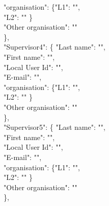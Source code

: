 {\begin{flushleft}
    "organisation": \{"L1": "\@supervisorCsSchool",\\
    \ifx\@supervisorCsDepartment\@empty\relax
    \else
    "L2": "\@supervisorCsDepartment"
    \fi
    \}\\
    \fi
    \else
    "Other organisation": "\@supervisorCsOrganization"\\
    \fi
    \},\\
    \fi
    \ifx\@supervisorDsLastname\@empty\relax
    \else
    "Supervisor4": \{ "Last name": "\@supervisorDsLastname",\\
    \ifx\@supervisorDsFirstname\@empty\relax
    \else
    "First name": "\@supervisorDsFirstname",\\
    \fi
    \ifx\@supervisorDsKTHID\@empty\relax
    \else
    "Local User Id": "\@supervisorDsKTHID",\\
    \fi
    \ifx\@supervisorDsEmail\@empty\relax
    \else
    "E-mail": "\@supervisorDsEmail",\\
    \fi
    \ifx\@supervisorDsOrganization\@empty
    \ifx\@supervisorDsSchool\@empty\relax
    \else
    "organisation": \{"L1": "\@supervisorDsSchool",\\
    \ifx\@supervisorDsDepartment\@empty\relax
    \else
    "L2": "\@supervisorDsDepartment"
    \fi
    \}\\
    \fi
    \else
    "Other organisation": "\@supervisorDsOrganization"\\
    \fi
    \},\\
    \fi
    \ifx\@supervisorEsLastname\@empty\relax
    \else
    "Supervisor5": \{ "Last name": "\@supervisorEsLastname",\\
    \ifx\@supervisorEsFirstname\@empty\relax
    \else
    "First name": "\@supervisorEsFirstname",\\
    \fi
    \ifx\@supervisorEsKTHID\@empty\relax
    \else
    "Local User Id": "\@supervisorEsKTHID",\\
    \fi
    \ifx\@supervisorEsEmail\@empty\relax
    \else
    "E-mail": "\@supervisorEsEmail",\\
    \fi
    \ifx\@supervisorEsOrganization\@empty
    \ifx\@supervisorEsSchool\@empty\relax
    \else
    "organisation": \{"L1": "\@supervisorEsSchool",\\
    \ifx\@supervisorEsDepartment\@empty\relax
    \else
    "L2": "\@supervisorEsDepartment"
    \fi
    \}\\
    \fi
    \else
    "Other organisation": "\@supervisorEsOrganization"\\
    \fi
    \},\\

\end{flushleft}}
